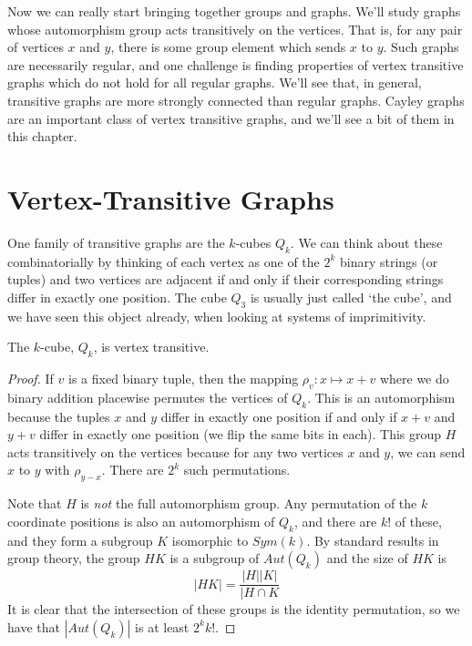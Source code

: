 \renewcommand{\exc}[1]{\subsubsection*{Exercise 3.#1}}




Now we can really start bringing together groups and graphs.  We'll study graphs whose automorphism group acts transitively on the vertices.  That is, for any pair of vertices $x$ and $y$, there is some group element which sends $x$ to $y$.  Such graphs are necessarily regular, and one challenge is finding properties of vertex transitive graphs which do not hold for all regular graphs.  We'll see that, in general, transitive graphs are more strongly connected than regular graphs.  Cayley graphs are an important class of vertex transitive graphs, and we'll see a bit of them in this chapter.



\section*{Vertex-Transitive Graphs}


One family of transitive graphs are the $k$-cubes $Q_k$.  We can think about these combinatorially by thinking of each vertex as one of the $2^k$ binary strings (or tuples) and two vertices are adjacent if and only if their corresponding strings differ in exactly one position.  The cube $Q_3$ is usually just called `the cube', and we have seen this object already, when looking at systems of imprimitivity.

\begin{lemma}
	The $k$-cube, $Q_k$, is vertex transitive.
\end{lemma}

\begin{proof}
	If $v$ is a fixed binary tuple, then the mapping $\rho_v:x\mapsto x+v$ where we do binary addition placewise permutes the vertices of $Q_k$.  This is an automorphism because the tuples $x$ and $y$ differ in exactly one position if and only if $x+v$ and $y+v$ differ in exactly one position (we flip the same bits in each).  This group $H$ acts transitively on the vertices because for any two vertices $x$ and $y$, we can send $x$ to $y$ with $\rho_{y-x}$. There are $2^k$ such permutations. 
	
	Note that $H$ is \textit{not} the full automorphism group.  Any permutation of the $k$ coordinate positions is also an automorphism of $Q_k$, and there are $k!$ of these, and they form a subgroup $K$ isomorphic to $Sym(k)$.  By standard results in group theory, the group $HK$ is a subgroup of $Aut(Q_k)$ and the size of $HK$ is
	$$|HK|=\frac{|H||K|}{|H\cap K}$$
	It is clear that the intersection of these groups is the identity permutation, so we have that $|Aut(Q_k)|$ is at least $2^kk!$. 
\end{proof}

